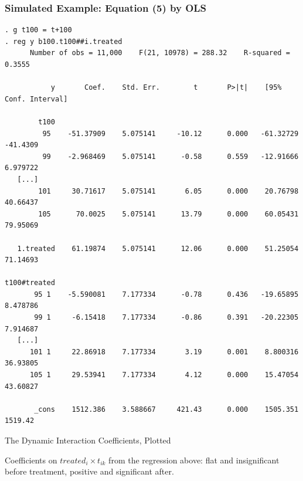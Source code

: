 \documentclass[11pt,aspectratio=169]{beamer}
\begin{document}
\begin{frame}[fragile]
  \frametitle{Simulated Example: Equation (5) by OLS}
{\tiny
\begin{verbatim}
. g t100 = t+100
. reg y b100.t100##i.treated
      Number of obs = 11,000    F(21, 10978) = 288.32    R-squared = 0.3555

           y       Coef.    Std. Err.        t       P>|t|    [95% Conf. Interval]

        t100
         95    -51.37909    5.075141     -10.12      0.000   -61.32729        -41.4309
         99    -2.968469    5.075141      -0.58      0.559   -12.91666        6.979722
   [...]
        101     30.71617    5.075141       6.05      0.000    20.76798        40.66437
        105      70.0025    5.075141      13.79      0.000    60.05431        79.95069

   1.treated    61.19874    5.075141      12.06      0.000    51.25054        71.14693

t100#treated
       95 1    -5.590081    7.177334      -0.78      0.436   -19.65895        8.478786
       99 1     -6.15418    7.177334      -0.86      0.391   -20.22305        7.914687
   [...]
      101 1     22.86918    7.177334       3.19      0.001    8.800316        36.93805
      105 1     29.53941    7.177334       4.12      0.000    15.47054        43.60827

       _cons    1512.386    3.588667     421.43      0.000    1505.351         1519.42
\end{verbatim}
}
\end{frame}

\begin{frame}{The Dynamic Interaction Coefficients, Plotted}
  \centering
  \vspace{0.3em}
  \footnotesize Coefficients on $treated_i \times t_{ik}$ from the regression above: flat and insignificant before treatment, positive and significant after.
\end{frame}
\end{document}
